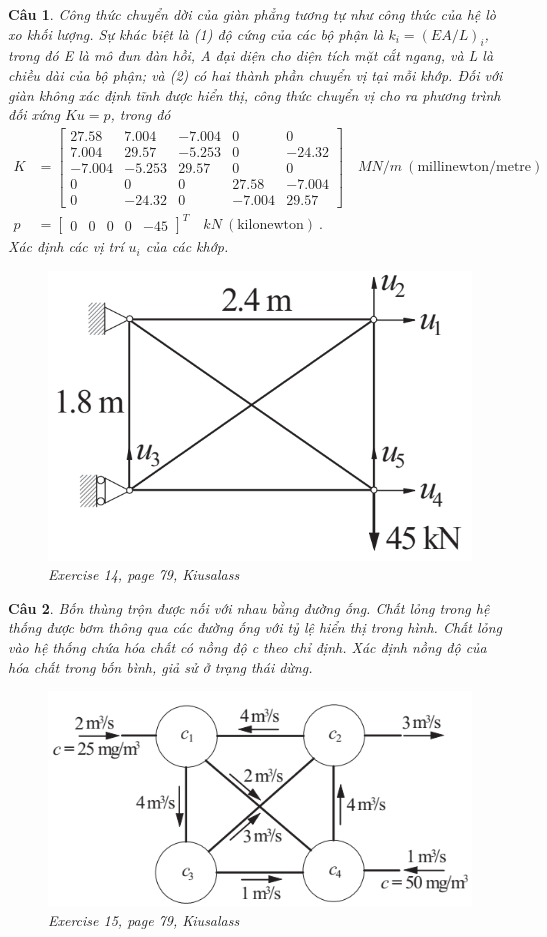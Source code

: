 \documentclass[11pt]{article}
\newtheorem{bt}{Câu}
\newcommand{\m}[1]{\begin{bmatrix}
		#1
\end{bmatrix}}
\begin{document}
\begin{bt}
Công thức chuyển dời của giàn phẳng tương tự như công thức của hệ lò xo khối lượng. Sự khác biệt là (1) độ cứng của các bộ phận là $k_i = (EA / L)_i$, trong đó E là mô đun đàn hồi, A đại diện cho diện tích mặt cắt ngang, và L là chiều dài của bộ phận; và (2) có hai thành phần chuyển vị tại mỗi khớp. Đối với giàn không xác định tĩnh được hiển thị, công thức chuyển vị cho ra phương trình đối xứng $Ku = p$, trong đó
\begin{align*}
K &=
\m{	27.58 & 7.004 &-7.004 &0 &0 \\
	7.004 &29.57& -5.253& 0 &-24.32 \\
	-7.004 &-5.253 &29.57& 0& 0 \\
	0& 0& 0& 27.58& -7.004 \\
	0& -24.32& 0 &-7.004& 29.57} \quad MN/m \ (\mbox{millinewton/metre}) \\
p &= \m{0 &0& 0& 0& -45}^T \quad kN \ (\mbox{kilonewton}) \ .
\end{align*}
Xác định các vị trí $u_i$ của các khớp.

\begin{figure}[h!]
	\centering
	\includegraphics[width=0.4\linewidth]{plane_truss}
	\caption{Exercise 14, page 79, Kiusalass}
	\label{fig:planetruss}
\end{figure}
\end{bt}

\newpage 

\begin{bt}
Bốn thùng trộn được nối với nhau bằng đường ống. Chất lỏng trong hệ thống được bơm thông qua các đường ống với tỷ lệ hiển thị trong hình. Chất lỏng vào hệ thống
chứa hóa chất có nồng độ c theo chỉ định. Xác định nồng độ của hóa chất trong bốn bình, giả sử ở trạng thái dừng.
\begin{figure}[h!]
	\centering
	\includegraphics[width=0.5\linewidth]{mixing_tank}
	\caption{Exercise 15, page 79, Kiusalass}
	\label{fig:mixingtank}
\end{figure}
\end{bt}
\end{document}
